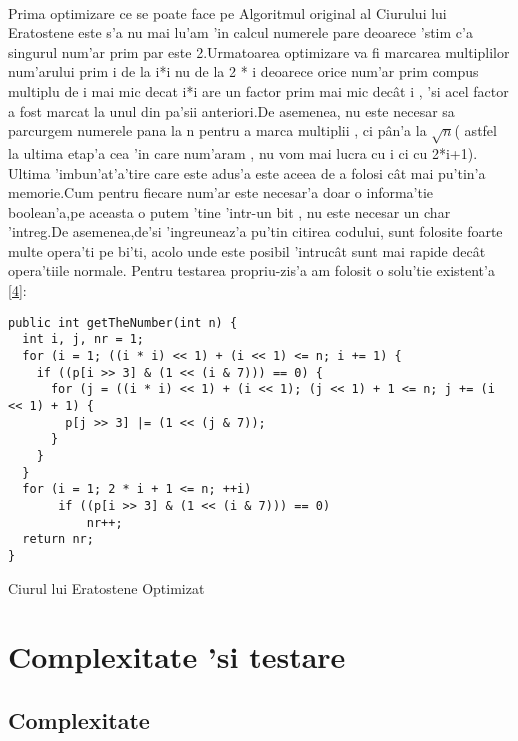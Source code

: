 \documentclass[12pt,twoside]{article}
\numberwithin{figure}{section}
\begin{document}
\paragraph{}
Prima optimizare ce se poate face pe Algoritmul original al Ciurului lui Eratostene este s'a nu mai lu'am 'in calcul numerele pare deoarece 'stim c'a singurul num'ar prim par este 2.Urmatoarea optimizare va fi marcarea multiplilor num'arului prim i de la i*i nu de la 2 * i deoarece orice num'ar prim compus multiplu de i mai mic decat i*i are un factor prim mai mic dec\^at i , 'si acel factor a fost marcat la unul din pa'sii anteriori.De asemenea, nu este necesar sa parcurgem numerele pana la n pentru a marca multiplii , ci p\^an'a la $\sqrt{n}$( astfel la ultima etap'a cea 'in care num'aram , nu vom mai lucra cu i ci cu 2*i+1). Ultima 'imbun'at'a'tire care este adus'a este aceea de a folosi c\^at mai pu'tin'a memorie.Cum pentru fiecare num'ar este necesar'a doar o informa'tie boolean'a,pe aceasta o putem 'tine 'intr-un bit , nu este necesar un char 'intreg.De asemenea,de'si 'ingreuneaz'a pu'tin citirea codului, sunt folosite foarte multe opera'ti pe bi'ti, acolo unde este posibil 'intruc\^at sunt mai rapide dec\^at opera'tiile normale. Pentru testarea propriu-zis'a am folosit o solu'tie existent'a \hyperlink{4}{[4]}:



\begin{algorithm}
\begin{lstlisting}
public int getTheNumber(int n) {
  int i, j, nr = 1;
  for (i = 1; ((i * i) << 1) + (i << 1) <= n; i += 1) {      
    if ((p[i >> 3] & (1 << (i & 7))) == 0) {
      for (j = ((i * i) << 1) + (i << 1); (j << 1) + 1 <= n; j += (i << 1) + 1) {
        p[j >> 3] |= (1 << (j & 7));
      }
    }
  }
  for (i = 1; 2 * i + 1 <= n; ++i)  
       if ((p[i >> 3] & (1 << (i & 7))) == 0) 
           nr++;
  return nr;
}
\end{lstlisting}
\caption{Ciurul lui Eratostene Optimizat}
\end{algorithm}

\newpage
\section{Complexitate 'si testare}
\subsection{Complexitate}
\begin{description}[font=$\bullet$~\normalfont\scshape\color{black!50!black}]
\item [Algoritmul lui Fermat]
\end{description}
\end{document}

